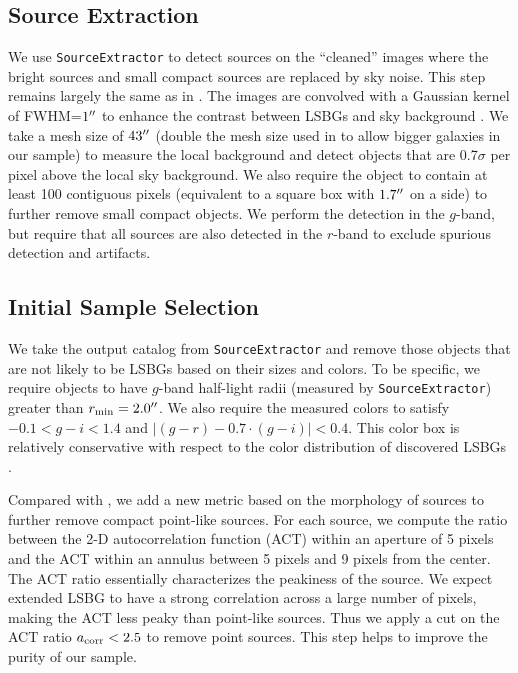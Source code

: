 \documentclass[twocolumn,astrosymb,twocolappendix,linenumbers]{aastex631}
\newcommand{\code}[1]{\texttt{#1}}
\begin{document}
\begin{CJK*}{UTF8}{gbsn}
\subsection{Source Extraction}
We use \code{SourceExtractor} to detect sources on the ``cleaned'' images where the bright sources and small compact sources are replaced by sky noise. This step remains largely the same as in . The images are convolved with a Gaussian kernel of FWHM=$1\mbox{$^{\prime\prime}$}$ to enhance the contrast between LSBGs and sky background \citep[e.g.,][]{Irwin1985,Akhlaghi2015,Greco2018}. We take a mesh size of $43\mbox{$^{\prime\prime}$}$ (double the mesh size used in  to allow bigger galaxies in our sample) to measure the local background and detect objects that are 0.7$\sigma$ per pixel above the local sky background. We also require the object to contain at least 100 contiguous pixels (equivalent to a square box with $1.7\mbox{$^{\prime\prime}$}$ on a side) to further remove small compact objects. We perform the detection in the $g$-band, but require that all sources are also detected in the $r$-band to exclude spurious detection and artifacts.
    
\subsection{Initial Sample Selection} 
We take the output catalog from \code{SourceExtractor} and remove those objects that are not likely to be LSBGs based on their sizes and colors. To be specific, we require objects to have $g$-band half-light radii (measured by \code{SourceExtractor}) greater than $r_{\rm min} = 2.0\mbox{$^{\prime\prime}$}$. We also require the measured colors to satisfy $-0.1 < g-i < 1.4$ and $|(g-r) - 0.7\cdot (g-i)| < 0.4$. This color box is relatively conservative with respect to the color distribution of discovered LSBGs \citep[e.g.,][]{SAGA-I,Greco2018,Zaritsky2019,Tanoglidis2021}. 

Compared with , we add a new metric based on the morphology of sources to further remove compact point-like sources. For each source, we compute the ratio between the 2-D autocorrelation function (ACT) within an aperture of 5 pixels and the ACT within an annulus between 5 pixels and 9 pixels from the center. The ACT ratio essentially characterizes the peakiness of the source. We expect extended LSBG to have a strong correlation across a large number of pixels, making the ACT less peaky than point-like sources. Thus we apply a cut on the ACT ratio $a_{\rm corr} < 2.5$ to remove point sources. This step helps to improve the purity of our sample.


\end{CJK*}
\end{document}
